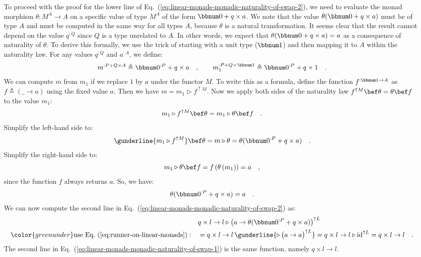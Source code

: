To proceed with the proof for the lower line of Eq.~(\ref{eq:linear-monads-monadic-naturality-of-swap-2}),
we need to evaluate the monad morphism $\theta:M^{A}\rightarrow A$
on a specific value of type $M^{A}$ of the form $\bbnum 0+q\times a$.
We note that the value $\theta(\bbnum 0+q\times a)$ must be of type
$A$ and must be computed in the same way for all types $A$, because
$\theta$ is a natural transformation. It seems clear that the result
cannot depend on the value $q^{:Q}$ since $Q$ is a type unrelated
to $A$. In other words, we expect that $\theta(\bbnum 0+q\times a)=a$
as a consequence of naturality of $\theta$. To derive this formally,
we use the trick of starting with a unit type ($\bbnum 1$) and then
mapping it to $A$ within the naturality law. For any values $q^{:Q}$
and $a^{:A}$, we define:
\[
m^{:P+Q\times A}\triangleq\bbnum 0^{:P}+q\times a\quad,\quad\quad m_{1}^{:P+Q\times\bbnum 1}\triangleq\bbnum 0^{:P}+q\times1\quad.
\]
We can compute $m$ from $m_{1}$ if we replace $1$ by $a$ under
the functor $M$. To write this as a formula, define the function
$f^{:\bbnum 1\rightarrow A}$ as $f\triangleq\left(\_\rightarrow a\right)$
using the fixed value $a$. Then we have $m=m_{1}\triangleright f^{\uparrow M}$.
Now we apply both sides of the naturality law $f^{\uparrow M}\bef\theta=\theta\bef f$
to the value $m_{1}$:
\[
m_{1}\triangleright f^{\uparrow M}\bef\theta=m_{1}\triangleright\theta\bef f\quad.
\]
Simplify the left-hand side to:
\[
\gunderline{m_{1}\triangleright f^{\uparrow M}}\bef\theta=m\triangleright\theta=\theta(\bbnum 0^{:P}+q\times a)\quad.
\]
Simplify the right-hand side to:
\[
m_{1}\triangleright\theta\bef f=f\left(\theta\left(m_{1}\right)\right)=a\quad,
\]
since the function $f$ always returns $a$. So, we have:
\begin{equation}
\theta(\bbnum 0^{:P}+q\times a)=a\quad.\label{eq:runner-on-linear-monads}
\end{equation}
We can now compute the second line in Eq.~(\ref{eq:linear-monads-monadic-naturality-of-swap-2})
as:
\begin{align*}
 & q\times l\rightarrow l\triangleright\big(a\rightarrow\theta(\bbnum 0^{:P}+q\times a)\big)^{\uparrow L}\\
{\color{greenunder}\text{use Eq.~(\ref{eq:runner-on-linear-monads})}:}\quad & =q\times l\rightarrow l\,\gunderline{\triangleright\,\big(a\rightarrow a\big)^{\uparrow L}}=q\times l\rightarrow l\triangleright\text{id}^{\uparrow L}=q\times l\rightarrow l\quad.
\end{align*}
The second line in Eq.~(\ref{eq:linear-monads-monadic-naturality-of-swap-1})
is the same function, namely $q\times l\rightarrow l$.

